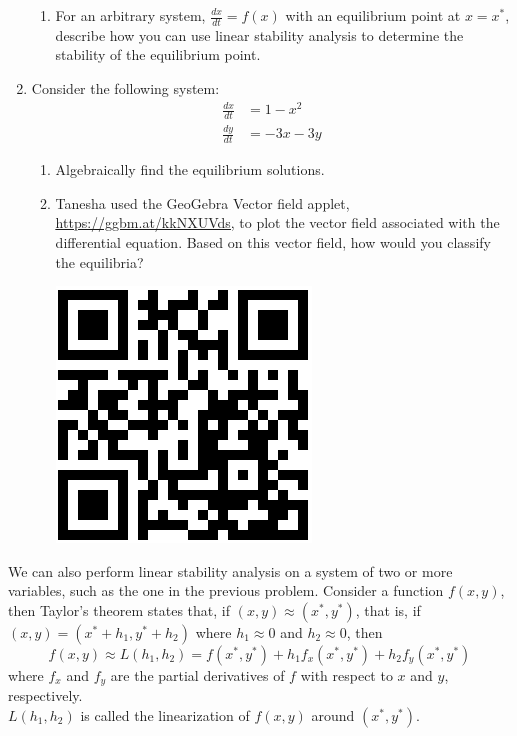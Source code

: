 \begin{enumerate}[resume]
\begin{enumerate}
\item For an arbitrary system, $\displaystyle\frac{dx}{dt}=f(x)$ with an equilibrium point at $x=x^*$, describe how you can use linear stability analysis to determine the stability of the equilibrium point. \label{15problem8partd} \vfill
\end{enumerate}

\item Consider the following system: \label{15problem9}
\begin{align*}
\frac{dx}{dt} &= 1-x^2 \\
\frac{dy}{dt} &= -3x -3y
\end{align*}
\begin{enumerate}
\item Algebraically find the equilibrium solutions. \label{15problem9parta} \vfill
\item Tanesha used the GeoGebra Vector field applet, \href{https://ggbm.at/kkNXUVds}{\underline{https://ggbm.at/kkNXUVds}}, to plot the vector field associated with the differential equation.  Based on this vector field, how would you classify the equilibria? \label{15problem9partb}

\vspace{-.25in}\hspace{-.75in}\includegraphics[width=.5in]{15/15VectorFieldQR.png}
\vfill
\end{enumerate}
\end{enumerate}

\clearpage

We can also perform linear stability analysis on a system of two or more variables, such as the one in the previous problem. Consider a function $f(x,y)$, then Taylor's theorem states that, if $(x,y) \approx (x^*,y^*)$, that is, if $(x,y) = (x^*+h_1, y^*+h_2)$ where $h_1 \approx 0$ and $h_2 \approx 0$, then
\[
f(x,y) \approx L(h_1,h_2) = f(x^*,y^*) + h_1f_x(x^*,y^*) + h_2f_y(x^*,y^*)
\]
where $f_x$ and $f_y$ are the partial derivatives of $f$ with respect to $x$ and $y$, respectively. \\

$L(h_1,h_2)$ is called the linearization of $f(x,y)$ around $(x^*,y^*)$.

